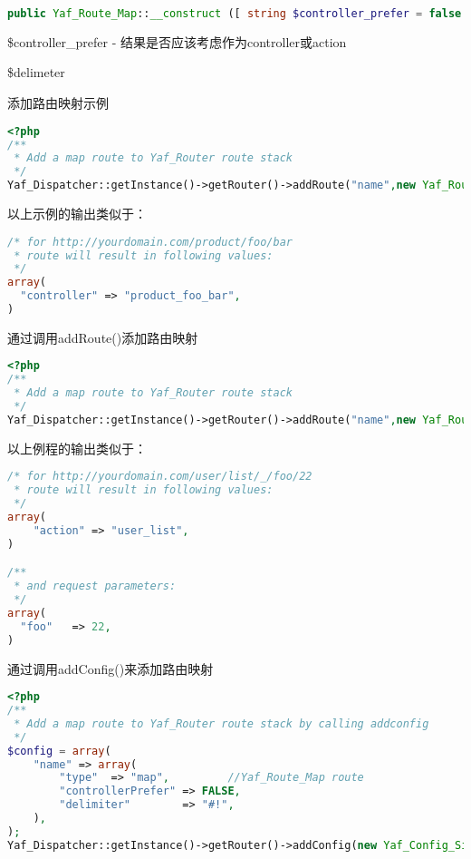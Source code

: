 \begin{lstlisting}[language=PHP]
public Yaf_Route_Map::__construct ([ string $controller_prefer = false [, string $delimiter = '' ]] )
\end{lstlisting}

\begin{compactitem}
\item \$controller\_prefer - 结果是否应该考虑作为controller或action
\item \$delimeter
\end{compactitem}







\begin{example}
添加路由映射示例
\begin{lstlisting}[language=PHP]
<?php
/**
 * Add a map route to Yaf_Router route stack
 */
Yaf_Dispatcher::getInstance()->getRouter()->addRoute("name",new Yaf_Route_Map());
\end{lstlisting}
\end{example}

以上示例的输出类似于：



\begin{lstlisting}[language=PHP]
/* for http://yourdomain.com/product/foo/bar
 * route will result in following values:
 */
array(
  "controller" => "product_foo_bar",
)
\end{lstlisting}


\begin{example}
通过调用addRoute()添加路由映射
\begin{lstlisting}[language=PHP]
<?php
/**
 * Add a map route to Yaf_Router route stack
 */
Yaf_Dispatcher::getInstance()->getRouter()->addRoute("name",new Yaf_Route_Map(true, "_"));
\end{lstlisting}
\end{example}

以上例程的输出类似于：

\begin{lstlisting}[language=PHP]
/* for http://yourdomain.com/user/list/_/foo/22
 * route will result in following values:
 */
array(
    "action" => "user_list",
)

/**
 * and request parameters:
 */
array(
  "foo"   => 22,
)
\end{lstlisting}

\begin{example}
通过调用addConfig()来添加路由映射
\begin{lstlisting}[language=PHP]
<?php
/**
 * Add a map route to Yaf_Router route stack by calling addconfig
 */
$config = array(
    "name" => array(
        "type"  => "map",         //Yaf_Route_Map route
        "controllerPrefer" => FALSE,
        "delimiter"        => "#!",
    ),
);
Yaf_Dispatcher::getInstance()->getRouter()->addConfig(new Yaf_Config_Simple($config));
\end{lstlisting}
\end{example}


